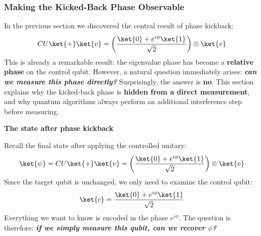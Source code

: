 \subsubsection{Making the Kicked-Back Phase Observable}\label{ex:making-the-kicked-back-phase-observable}

In the previous section we discovered the central result of phase kickback:
\begin{equation*}
    CU\ket{+}\ket{v} = \left(\frac{\ket{0}+e^{i\phi}\ket{1}}{\sqrt{2}}\right) \otimes \ket{v}
\end{equation*}
This is already a remarkable result: the eigenvalue phase has become a \textbf{relative phase} on the control qubit. However, a natural question immediately arises: \emph{\textbf{can we measure this phase directly?}} Surprisingly, the answer is \textbf{no}. This section explains why the kicked-back phase is \textbf{hidden from a direct measurement}, and why quantum algorithms always perform an additional interference step before measuring.

\highspace
\begin{flushleft}
    \textcolor{Green3}{ \textbf{The state after phase kickback}}
\end{flushleft}
Recall the final state after applying the controlled unitary:
\begin{equation*}
    \ket{\psi} = CU\ket{+}\ket{v} = \left(\frac{\ket{0}+e^{i\phi}\ket{1}}{\sqrt{2}}\right) \otimes \ket{v}
\end{equation*}
Since the target qubit is unchanged, we only need to examine the control qubit:
\begin{equation*}
    \ket{c} = \frac{\ket{0}+e^{i\phi}\ket{1}}{\sqrt{2}}
\end{equation*}
Everything we want to know is encoded in the phase $e^{i\phi}$. The question is therefore: \emph{\textbf{if we simply measure this qubit, can we recover $\phi$?}}

